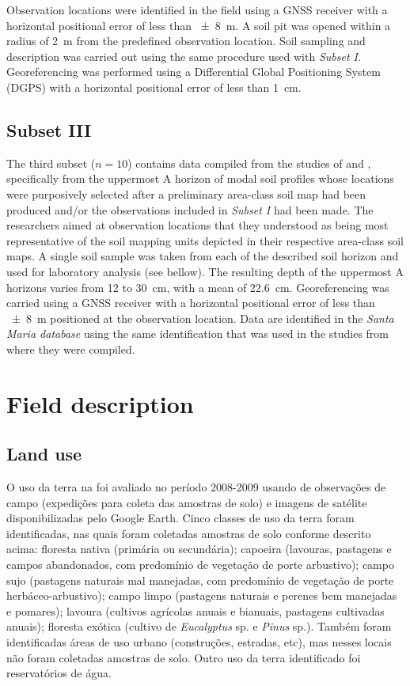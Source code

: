 Observation locations were identified in the field using a GNSS receiver with a horizontal positional error
of less than \SI{\pm8}{\metre}. A soil pit was opened within a radius of \SI{2}{\metre} from the predefined 
observation location. Soil sampling and description was carried out using the same procedure used with 
\emph{Subset I}. Georeferencing was performed using a Differential Global Positioning System (DGPS) with 
a horizontal positional error of less than \SI{1}{\centi\metre}.

\tocless\subsection{Subset III}

The third subset ($n = 10$) contains data compiled from the studies of  and
, specifically from the uppermost A horizon of modal soil profiles whose locations 
were purposively selected after a preliminary area-class soil map had been produced and/or the observations
included in \emph{Subset I} had been made. The researchers aimed at observation locations that they 
understood as being most representative of the soil mapping units depicted in their respective area-class 
soil maps. A single soil sample was taken from each of the described soil horizon and used for laboratory 
analysis (see bellow). The resulting depth of the uppermost A horizons varies from \num{12} to 
\SI{30}{\centi\metre}, with a mean of \SI{22.6}{\centi\metre}. Georeferencing was carried using a GNSS 
receiver with a horizontal positional error of less than \SI{\pm8}{\metre} positioned at the observation 
location. Data are identified in the \emph{Santa Maria database} using the same identification that was 
used in the studies from where they were compiled.

\tocless\section{Field description}

\tocless\subsection{Land use}

O uso da terra na foi avaliado no período 2008-2009 usando de observações de campo (expedições para coleta das amostras de solo) e imagens de satélite disponibilizadas pelo Google Earth\textregistered. Cinco classes de uso da terra foram identificadas, nas quais foram coletadas amostras de solo conforme descrito acima: floresta nativa (primária ou secundária); capoeira (lavouras, pastagens e campos abandonados, com predomínio de vegetação de porte arbustivo); campo sujo (pastagens naturais mal manejadas, com predomínio de vegetação de porte herbáceo-arbustivo); campo limpo (pastagens naturais e perenes bem manejadas e pomares); lavoura (cultivos agrícolas anuais e bianuais, pastagens cultivadas anuais); floresta exótica (cultivo de \textit{Eucalyptus} sp. e \textit{Pinus} sp.). Também foram identificadas áreas de uso urbano (construções, estradas, etc), mas nesses locais não foram coletadas amostras de solo. Outro uso da terra identificado foi reservatórios de água.

